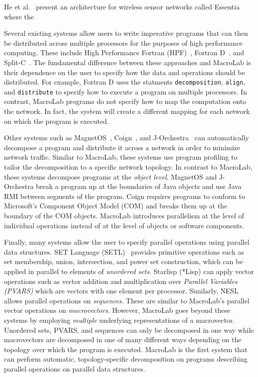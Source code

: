 He et al.~\cite{he2008essentia} present an architecture for wireless sensor
networks called Essentia where the 

Several existing systems allow users to write imperative programs that can then
be distributed across multiple processors for the purposes of high performance
computing.  These include High Performance Fortran (HPF)~\cite{Richardson},
Fortran D~\cite{Hiranandani}, and Split-C~\cite{Culler}.  The fundamental
difference between these approaches and MacroLab is their dependence on the user
to specify how the data and operations should be distributed. For example,
Fortran D uses the statments \texttt{decomposition}, \texttt{align}, and
\texttt{distribute} to specify how to execute a program on multiple processors.
In contrast, MacroLab programs do not specify how to map the computation onto
the network. In fact, the system will create a different mapping for each
network on which the program is executed.

Other systems such as MagnetOS~\cite{Liu}, Coign~\cite{Hunt}, and
J-Orchestra~\cite{Tilevich} can automatically decompose a program and distribute
it across a network in order to minimize network traffic.  Similar to MacroLab,
these systems use program profiling to tailor the decomposition to a specific
network topology.  In contrast to MacroLab, these systems decompose programs at
the {\em object level}.  MagnetOS and J-Orchestra break a program up at the
boundaries of Java objects and use Java RMI between segments of the program.
Coign requires programs to conform to Microsoft's Component Object Model (COM)
and breaks them up at the boundary of the COM objects.  MacroLab introduces
parallelism at the level of individual operations instead of at the level of
objects or software components.

Finally, many systems allow the user to specify parallel operations using
parallel data structures. SET Language (SETL)~\cite{Schonberg} provides
primitive operations such as set membership, union, intersection, and power set
construction, which can be applied in parallel to elements of {\em unordered
sets}. Starlisp (*Lisp) can apply vector operations such as vector addition and
multiplication over {\em Parallel Variables (PVARS)} which are vectors with one
element per processor.  Similarly, NESL allows parallel operations on {\em
sequences}. These are similar to MacroLab's parallel vector operations on {\em
macrovectors}. However, MacroLab goes beyond these systems by employing {\em
multiple} underlying representations of a macrovector.  Unordered sets, PVARS,
and sequences can only be decomposed in one way while macrovectors are
decomposed in one of many different ways depending on the topology over which
the program is executed. MacroLab is the first system that can perform
automatic, topology-specific decomposition on programs describing parallel
operations on parallel data structures.

